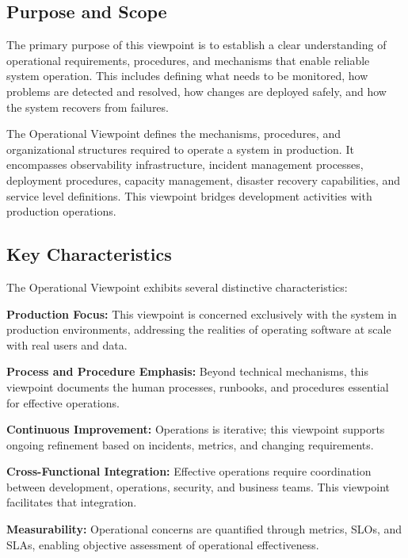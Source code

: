 \documentclass[11pt,letterpaper]{article}
\begin{document}
\subsection{Purpose and Scope}

The primary purpose of this viewpoint is to establish a clear understanding of operational requirements, procedures, and mechanisms that enable reliable system operation. This includes defining what needs to be monitored, how problems are detected and resolved, how changes are deployed safely, and how the system recovers from failures.

\begin{definitionbox}
The Operational Viewpoint defines the mechanisms, procedures, and organizational structures required to operate a system in production. It encompasses observability infrastructure, incident management processes, deployment procedures, capacity management, disaster recovery capabilities, and service level definitions. This viewpoint bridges development activities with production operations.
\end{definitionbox}

\subsection{Key Characteristics}

The Operational Viewpoint exhibits several distinctive characteristics:

\textbf{Production Focus:} This viewpoint is concerned exclusively with the system in production environments, addressing the realities of operating software at scale with real users and data.

\textbf{Process and Procedure Emphasis:} Beyond technical mechanisms, this viewpoint documents the human processes, runbooks, and procedures essential for effective operations.

\textbf{Continuous Improvement:} Operations is iterative; this viewpoint supports ongoing refinement based on incidents, metrics, and changing requirements.

\textbf{Cross-Functional Integration:} Effective operations require coordination between development, operations, security, and business teams. This viewpoint facilitates that integration.

\textbf{Measurability:} Operational concerns are quantified through metrics, SLOs, and SLAs, enabling objective assessment of operational effectiveness.
\end{document}

